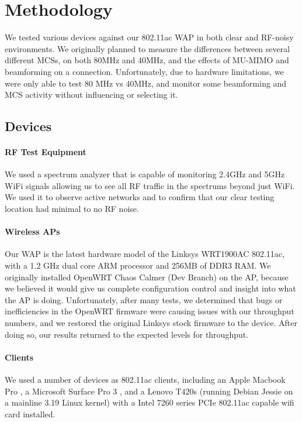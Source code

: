 \section{Methodology}
\label{sec:methodology}

We tested various devices against our 802.11ac WAP in both clear and RF-noisy
environments. We originally planned to measure the differences between several
different MCSs, on both 80MHz and 40MHz, and the effects of MU-MIMO and
beamforming on a connection. Unfortunately, due to hardware limitations, we were
only able to test 80 MHz vs 40MHz, and monitor some beamforming and MCS activity
without influencing or selecting it.

\subsection{Devices}

\paragraph{RF Test Equipment}

We used a spectrum analyzer that is capable of monitoring 2.4GHz and 5GHz WiFi
signals allowing us to see all RF traffic in the spectrums beyond just WiFi.
We used it to observe active networks and to confirm that our clear testing
location had minimal to no RF noise.

\paragraph{Wireless APs}

Our WAP is the latest hardware model of the Linksys WRT1900AC 802.11ac,
with a 1.2 GHz dual core ARM processor and 256MB of DDR3 RAM. We originally
installed OpenWRT Chaos Calmer (Dev Branch) on the AP, because we believed it
would give us complete configuration control and insight into what the AP is
doing. Unfortunately, after many tests, we determined that bugs or
inefficiencies in the OpenWRT firmware were causing issues with our throughput
numbers, and we restored the original Linksys stock firmware to the device.
After doing so, our results returned to the expected levels for throughput.

\paragraph{Clients}

We used a number of devices as 802.11ac clients, including an Apple
Macbook Pro , a Microsoft Surface Pro 3 , and a
Lenovo T420s (running Debian Jessie on a mainline 3.19 Linux kernel)
with a Intel 7260 series PCIe 802.11ac capable wifi card installed.

